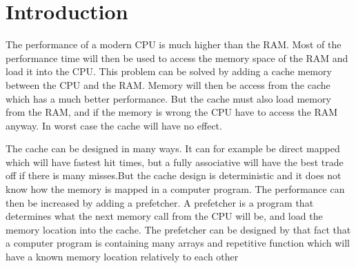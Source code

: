 \section*{Introduction}
The performance of a modern CPU is much higher than the RAM. Most of the performance time will then be used to access the memory space of the RAM and load it into the CPU. This problem can be solved by adding a cache memory between the CPU and the RAM. Memory will then be access from the cache which has a much better performance. But the cache must also load memory from the RAM, and if the memory is wrong the CPU have to access the RAM anyway. In worst case the cache will have no effect.

The cache can be designed in many ways. It can for example be direct mapped which will have fastest hit times, but a fully associative will have the best trade off if there is many misses.But the cache design is deterministic and it does not know how the memory is mapped in a computer program. The performance can then be increased by adding a prefetcher. A prefetcher is a program that determines what the next memory call from the CPU will be, and load the memory location into the cache. The prefetcher can be designed by that fact that a computer program is containing many arrays and repetitive function which will have a known memory location relatively to each other  
